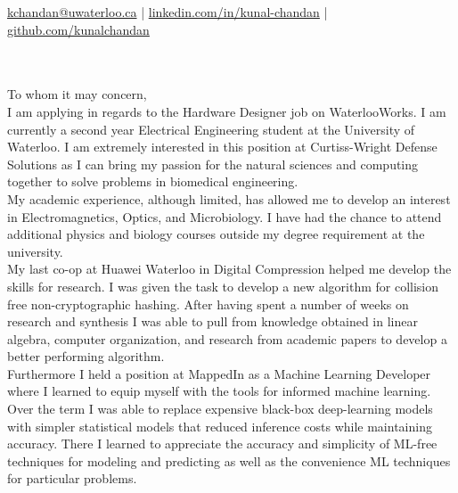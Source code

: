\documentclass[]{chandan-cv}
\begin{document}
%
%

%
%
{
	\href{mailto:kchandan@uwaterloo.ca}{kchandan@uwaterloo.ca} \qquad
	| \qquad
	\href{https://www.linkedin.com/in/kunal-chandan/}{linkedin.com/in/kunal-chandan} \qquad
	| \qquad
	\href{http://github.com/kunalchandan}{github.com/kunalchandan}
}

\begin{minipage}[t]{0.2\textwidth}
\end{minipage}
\begin{minipage}[t]{0.8\textwidth}
\\
\vspace{10pt}
\large
\\
To whom it may concern,\\


\qquad I am applying in regards to the Hardware Designer job on WaterlooWorks.
I am currently a second year Electrical Engineering student at the University of Waterloo. 
I am extremely interested in this position at Curtiss-Wright Defense Solutions as I can bring my passion for the natural sciences and computing together to solve problems in biomedical engineering.
\\


\qquad My academic experience, although limited, has allowed me to develop an interest in Electromagnetics, Optics, and Microbiology.
I have had the chance to attend additional physics and biology courses outside my degree requirement at the university. 
\\

\qquad My last co-op at Huawei Waterloo in Digital Compression helped me develop the skills for research. 
I was given the task to develop a new algorithm for collision free non-cryptographic hashing. 
After having spent a number of weeks on research and synthesis I was able to pull from knowledge obtained in linear algebra, computer organization, and research from academic papers to develop a better performing algorithm.
\\

\qquad Furthermore I held a position at MappedIn as a Machine Learning Developer where I learned to equip myself with the tools for informed machine learning. 
Over the term I was able to replace expensive black-box deep-learning models with simpler statistical models that reduced inference costs while maintaining accuracy. 
There I learned to appreciate the accuracy and simplicity of ML-free techniques for modeling and predicting as well as the convenience ML techniques for particular problems. 
\\



\end{minipage}
\end{document}

